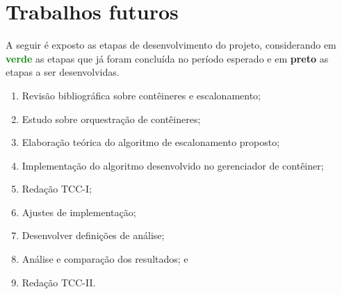 \documentclass[
	12pt,				%
	openright,			%
	oneside,			%
	a4paper,			%
	brazil				%
	]{abntex2}
\begin{document}
\section{Trabalhos futuros}
\noindent
A seguir é exposto as etapas de desenvolvimento do projeto, considerando em \textbf{\textcolor{green}{verde}} as etapas que já foram concluída no período esperado e em \textbf{preto} as etapas a ser desenvolvidas. 

\begin{enumerate}
	\item Revisão bibliográfica sobre contêineres e escalonamento;
	\item Estudo sobre orquestração de contêineres;
	\item Elaboração teórica do algoritmo de escalonamento proposto;
	\item Implementação do algoritmo desenvolvido no gerenciador de contêiner;

	\item Redação TCC-I;
	\item Ajustes de implementação;
	\item Desenvolver definições de análise;
	\item Análise e comparação dos resultados; e
	\item Redação TCC-II.
\end{enumerate}
\end{document}
